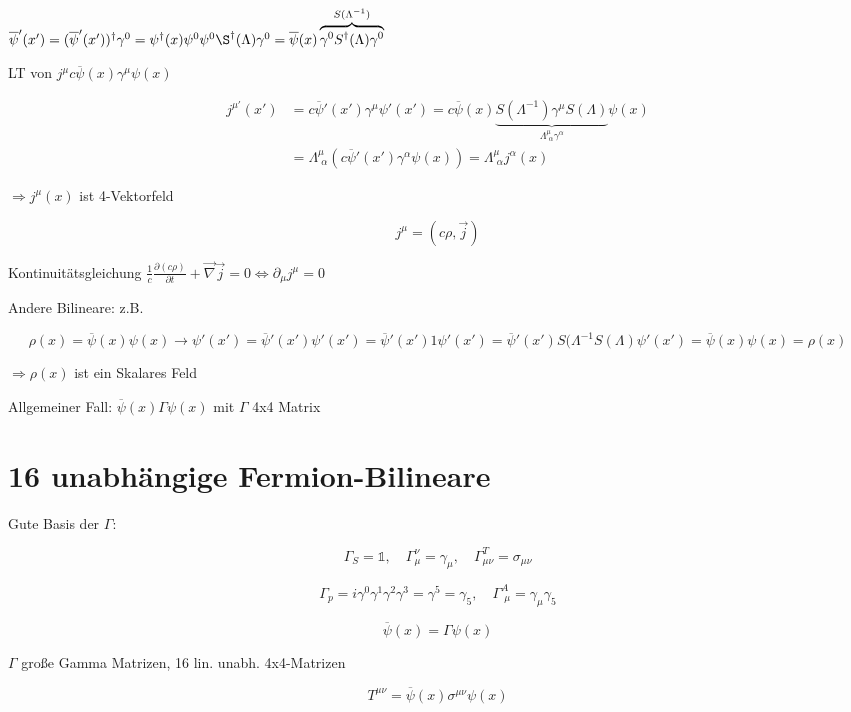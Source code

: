 \(\overline\psi'(x') = (\overline\psi'(x'))^\dagger\gamma^0 = \psi^\dagger(x)\psi^0\psi^0\S^\dagger(\Lambda)\gamma^0 =\overline\psi(x)\overbrace{\gamma^0S^\dagger(\Lambda)\gamma^0}^{S(\Lambda^{-1})}  \)

LT von \(j^\mu c\overline\psi(x)\gamma^\mu\psi(x)\)

\begin{align}
j^{\mu'}(x') &= c\overline\psi'(x')\gamma^\mu\psi'(x') = c\overline\psi(x)\underbrace{S(\Lambda^{-1})\gamma^\mu S(\Lambda)}_{\Lambda^\mu_{\,\,\alpha}\gamma^\alpha}\psi(x)\\
&=\Lambda^\mu_{\,\,\alpha}(c\overline\psi'(x')\gamma^\alpha\psi(x)) = \Lambda^\mu_{\,\,\alpha}j^\alpha(x)
\end{align}

\(\Rightarrow j^\mu(x)\) ist 4-Vektorfeld

\[j^\mu = (c\rho,\vec j)\]

Kontinuitätsgleichung \(\frac{1}{c}\frac{\partial(c \rho) }{\partial t} + \vec\nabla\vec j = 0 \Leftrightarrow  \partial_\mu j^\mu = 0 \)

Andere Bilineare: z.B.

\[\rho(x) = \overline \psi(x)\psi(x) \rightarrow \psi'(x') = \overline \psi'(x')\psi'(x') = \overline \psi'(x')\mathcal 1 \psi'(x') = \overline \psi'(x') S(\Lambda^{-1}S(\Lambda) \psi'(x') = \overline \psi(x)\psi(x) = \rho(x) \]

\(\Rightarrow \rho(x)\) ist ein Skalares Feld

Allgemeiner Fall: \( \overline \psi(x)\Gamma \psi(x)  \) mit \(\Gamma\) 4x4 Matrix

\section{16 unabhängige Fermion-Bilineare}

Gute Basis der \(\Gamma\):

\[\Gamma_S = \mathbb 1, \quad \Gamma^\nu_\mu =\gamma_\mu, \quad \Gamma^T_{\mu\nu} = \sigma_{\mu\nu}\]

\[\Gamma_p = i\gamma^0\gamma^1\gamma^2\gamma^3 = \gamma^5 = \gamma_5, \quad \Gamma^A_{\,\,\mu} = \gamma_\mu\gamma_5 \]




\[\overline \psi(x) = \Gamma\psi(x)\]

\(\Gamma\) große Gamma Matrizen, 16 lin. unabh. 4x4-Matrizen

\[T^{\mu\nu}=\overline \psi(x)\sigma^{\mu\nu} \psi(x) \]

